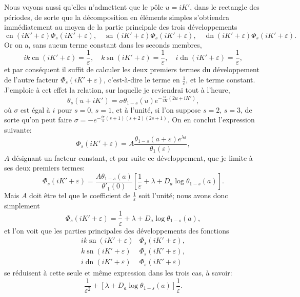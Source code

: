 \documentclass[11pt,leqno,oneside,letterpaper]{book}[2005/09/16]
\DeclareMathOperator{\sn}{sn}
\DeclareMathOperator{\cn}{cn}
\DeclareMathOperator{\dn}{dn}
\begin{document}
Nous voyons aussi qu'elles n'admettent que le p\^ole $u = iK'$, dans le
rectangle des p\'eriodes, de sorte que la d\'ecomposition en \'el\'ements
simples s'obtiendra imm\'ediatement au moyen de la partie principale des
trois d\'eveloppe\-ments
\[
\cn(iK' + \varepsilon) \Phi_s(iK' + \varepsilon), \quad
\sn(iK' + \varepsilon) \Phi_s(iK' + \varepsilon), \quad
\dn(iK' + \varepsilon) \Phi_s(iK' + \varepsilon).
\]
Or on a, sans aucun terme constant dans les seconds membres,
\[
ik \cn(iK' + \varepsilon) = \frac{1}{\varepsilon}, \quad
 k \sn(iK' + \varepsilon) = \frac{1}{\varepsilon}, \quad
 i \dn(iK' + \varepsilon) = \frac{1}{\varepsilon},
\]
et par cons\'equent il suffit de calculer les deux premiers termes du d\'eveloppe\-ment
de l'autre facteur $\Phi_s(iK' + \varepsilon)$, c'est-\`a-dire le terme en $\frac{1}{\varepsilon}$, et le
terme constant. J'emploie \`a cet effet la relation, sur laquelle je reviendrai
tout \`a l'heure,
\[
\theta_s(u+iK') = \sigma \theta_{1-s}(u) e^{-\frac{i\pi}{4K} (2u + iK')},
\]
o\`u $\sigma$ est \'egal \`a $i$ pour $s = 0$, $s = 1$, et \`a l'unit\'e, si l'on suppose $s = 2$,
$s = 3$, de sorte qu'on peut faire $\sigma = -e^{-\frac{i\pi}{4} (s+1)(s+2)(2s+1)}$. On en conclut
l'expression suivante:
\[
\Phi_s(iK' + \varepsilon) = A\frac{\theta_{1-s}(a + \varepsilon) e^{\lambda \varepsilon}}{\theta_1(\varepsilon)},
\]
$A$ d\'esignant un facteur constant, et par suite ce d\'eveloppement, que je
limite \`a ses deux premiers termes:
\[
\Phi_s(iK' + \varepsilon) = \frac{A\theta_{1-s}(a)}{\theta'_1(0)}
  \left[ \frac{1}{\varepsilon} + \lambda + D_a \log \theta_{1-s}(a) \right].
\]
Mais $A$ doit \^etre tel que le coefficient de $\frac{1}{\varepsilon}$ soit
l'unit\'e; nous avons donc simplement
\[
\Phi_s(iK' + \varepsilon) = \frac{1}{\varepsilon} + \lambda + D_a \log \theta_{1-s}(a),
\]
et l'on voit que les parties principales des d\'eveloppements des fonctions
\begin{align*}
ik\sn(iK' + \varepsilon) &\Phi_s(iK' + \varepsilon), \\
 k\sn(iK' + \varepsilon) &\Phi_s(iK' + \varepsilon), \\
 i\dn(iK' + \varepsilon) &\Phi_s(iK' + \varepsilon)
\end{align*}
se r\'eduisent \`a cette seule et m\^eme expression dans les trois cas, \`a savoir:
\[
\frac{1}{\varepsilon^2} + \left[\lambda + D_a \log \theta_{1-s}(a)\right] \frac{1}{\varepsilon}.
\]
\medskip
\end{document}
